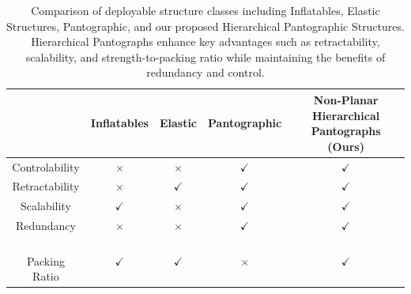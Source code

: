 \begin{table}[ht]
    \centering
    \begin{tabular}{|c|c|c|c|c|} \hline
        & Inflatables & Elastic & Pantographic & \parbox[c]{3.5cm}{\centering \textbf{Non-Planar Hierarchical}\\ \textbf{Pantographs (Ours)}} \\ \hline
        Controlability & $\times$ & $\times$ & $\checkmark$ & $\boldsymbol\checkmark$ \\ \hline
        Retractability & $\times$ & $\checkmark$ & $\checkmark$ & $\boldsymbol\checkmark$ \\ \hline
        Scalability & $\checkmark$ & $\times$ & $\checkmark$ & $\boldsymbol\checkmark$ \\ \hline
        Redundancy & $\times$ & $\times$ & $\checkmark$ & $\boldsymbol\checkmark$ \\ \hline
        \parbox[c]{3.5cm}{\\ {Packing Ratio}} & $\checkmark$ & $\checkmark$ & $\times$ & $\boldsymbol\checkmark$ \\ \hline
    \end{tabular}
    
    \caption{{Comparison of deployable structure classes including Inflatables, Elastic Structures, Pantographic, and our proposed Hierarchical Pantographic Structures. Hierarchical Pantographs enhance key advantages such as retractability, scalability, and strength-to-packing ratio while maintaining the benefits of redundancy and control.}}
    \label{tab:structure_comparison}
\end{table}

